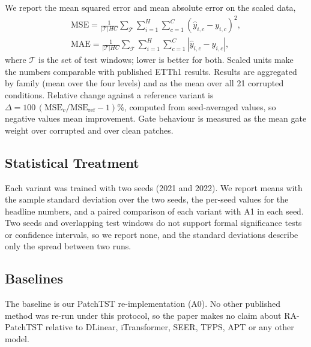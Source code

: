 We report the mean squared error and mean absolute error on the scaled data,
\begin{equation}
\begin{gathered}
\mathrm{MSE}=\frac{1}{|\mathcal{T}|HC}\sum_{\mathcal{T}}\sum_{i=1}^{H}\sum_{c=1}^{C}(\hat{y}_{i,c}-y_{i,c})^2,\\
\mathrm{MAE}=\frac{1}{|\mathcal{T}|HC}\sum_{\mathcal{T}}\sum_{i=1}^{H}\sum_{c=1}^{C}|\hat{y}_{i,c}-y_{i,c}|,
\end{gathered}
\label{eq:metrics}
\end{equation}
where $\mathcal{T}$ is the set of test windows; lower is better for both. Scaled units make the numbers comparable with published ETTh1 results. Results are aggregated by family (mean over the four levels) and as the mean over all 21 corrupted conditions. Relative change against a reference variant is $\Delta=100\,(\mathrm{MSE}_{v}/\mathrm{MSE}_{\mathrm{ref}}-1)\%$, computed from seed-averaged values, so negative values mean improvement. Gate behaviour is measured as the mean gate weight over corrupted and over clean patches.

\subsection{Statistical Treatment}

Each variant was trained with two seeds (2021 and 2022). We report means with the sample standard deviation over the two seeds, the per-seed values for the headline numbers, and a paired comparison of each variant with A1 in each seed. Two seeds and overlapping test windows do not support formal significance tests or confidence intervals, so we report none, and the standard deviations describe only the spread between two runs.

\subsection{Baselines}

The baseline is our PatchTST re-implementation (A0). No other published method was re-run under this protocol, so the paper makes no claim about RA-PatchTST relative to DLinear, iTransformer, SEER, TFPS, APT or any other model.
